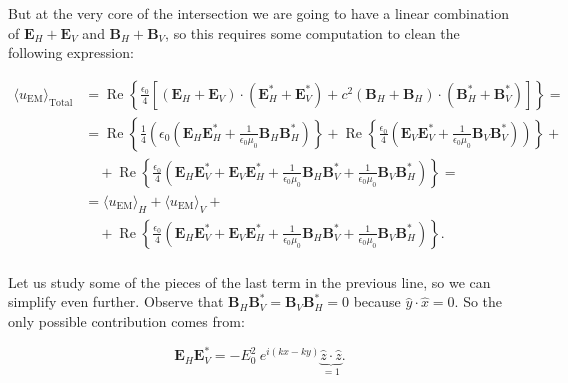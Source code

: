But at the very core of the intersection we are going to have a linear combination of $\mathbf{E}_{H}+\mathbf{E}_{V}$ and $\mathbf{B}_{H}+\mathbf{B}_{V}$, so this requires some computation to clean the following expression:
	
\begin{equation}
	\begin{split}
		\langle u_{\mathrm{EM}} \rangle_{\text{Total}}&= \operatorname{Re}\left\{\frac{\epsilon_{0}}{4}\left[\left(\mathbf{E}_{H}+\mathbf{E}_{V}\right) \cdot\left(\mathbf{E}_{H}^{*}+\mathbf{E}_{V}^{*}\right)+c^{2}\left(\mathbf{B}_{H}+\mathbf{B}_{H}\right) \cdot\left(\mathbf{B}_{H}^{*}+\mathbf{B}_{V}^{*}\right)\right]\right\}=\\
        &=\operatorname{Re}\left\{\frac{1}{4} \left( \epsilon_{0}\left(\mathbf{E}_{H}\mathbf{E}_{H}^{*} + \tfrac{1}{\epsilon_{0}\mu_{0}} \mathbf{B}_{H}\mathbf{B}_{H}^{*} \right)\right\}+\operatorname{Re}\left\{\frac{\epsilon_{0}}{4}\left(\mathbf{E}_{V}\mathbf{E}_{V}^{*} + \tfrac{1}{\epsilon_{0}\mu_{0}} \mathbf{B}_{V}\mathbf{B}_{V}^{*}\right) \right)\right\} +\\ 
		&\quad +\operatorname{Re}\left\{\frac{\epsilon_{0}}{4}\left(\mathbf{E}_{H}\mathbf{E}_{V}^{*} + \mathbf{E}_{V}\mathbf{E}_{H}^{*}+ \tfrac{1}{\epsilon_{0}\mu_{0}} \mathbf{B}_{H}\mathbf{B}_{V}^{*} +  \tfrac{1}{\epsilon_{0}\mu_{0}} \mathbf{B}_{V}\mathbf{B}_{H}^{*}\right)\right\}=\\
		&=\langle u_{\mathrm{EM}}\rangle_{H}+\langle u_{\mathrm{EM}}\rangle_{V}+\\
		&\quad+\operatorname{Re}\left\{\frac{\epsilon_{0}}{4}\left(\mathbf{E}_{H}\mathbf{E}_{V}^{*} + \mathbf{E}_{V}\mathbf{E}_{H}^{*}+ \tfrac{1}{\epsilon_{0}\mu_{0}} \mathbf{B}_{H}\mathbf{B}_{V}^{*} +  \tfrac{1}{\epsilon_{0}\mu_{0}} \mathbf{B}_{V}\mathbf{B}_{H}^{*}\right)\right\}. \\
	\end{split}
\end{equation}

Let us study some of the pieces of the last term in the previous line, so we can simplify even further. Observe that $\mathbf{B}_{H} \mathbf{B}_{V}^{*} = \mathbf{B}_{V} \mathbf{B}_{H}^{*} = 0$ because $\hat{y}\cdot \hat{x} = 0$. So the only possible contribution comes from:
	
\begin{equation}
	\mathbf{E}_{H} \mathbf{E}_{V}^{*} = - E_{0}^{2}\: e^{i(k x - ky)} \underbrace{\hat{z}\cdot\hat{z}}_{= 1}.
\end{equation}

